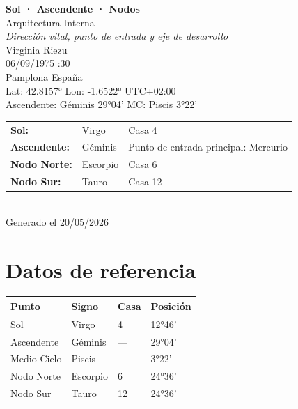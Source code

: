 \documentclass[11pt,a4paper]{article}
\begin{document}
\begin{titlepage}
  \centering
  \vspace*{1.5cm}
  {\Huge\bfseries\color{azulai} Sol · Ascendente · Nodos}\\[0.5cm]
  {\large\color{grisai} Arquitectura Interna}\\[0.3cm]
  {\small\itshape\color{grisai} Dirección vital, punto de entrada y eje de desarrollo}\\[2cm]
  {\huge\color{doradoai} Virginia Riezu}\\[1.5cm]
  {\Large 06/09/1975 :30}\\[0.3cm]
  {\Large Pamplona España}\\[0.3cm]
  {\normalsize Lat: 42.8157° \quad Lon: -1.6522° \quad UTC+02:00}\\[0.3cm]
  {\normalsize Ascendente: Géminis 29°04' \quad
    MC: Piscis 3°22'}\\[2cm]
  \begin{tabular}{lll}
    \textbf{Sol:} & Virgo & Casa 4 \\
    \textbf{Ascendente:} & Géminis & Punto de entrada principal: Mercurio \\
    \textbf{Nodo Norte:} & Escorpio & Casa 6 \\
    \textbf{Nodo Sur:}   & Tauro & Casa 12 \\
  \end{tabular}\\[2cm]
  \vfill
  {\small Generado el 20/05/2026}
\end{titlepage}

\tableofcontents
\newpage

\section{Datos de referencia}

\begin{center}
\begin{tabular}{llll}
  \toprule
  \textbf{Punto} & \textbf{Signo} & \textbf{Casa} & \textbf{Posición} \\
  \midrule
  Sol           & Virgo & 4 & 12°46' \\
  Ascendente    & Géminis & --- & 29°04' \\
  Medio Cielo   & Piscis & --- & 3°22' \\
  Nodo Norte    & Escorpio & 6 & 24°36' \\
  Nodo Sur      & Tauro & 12 & 24°36' \\
  \bottomrule
\end{tabular}
\end{center}
\end{document}
